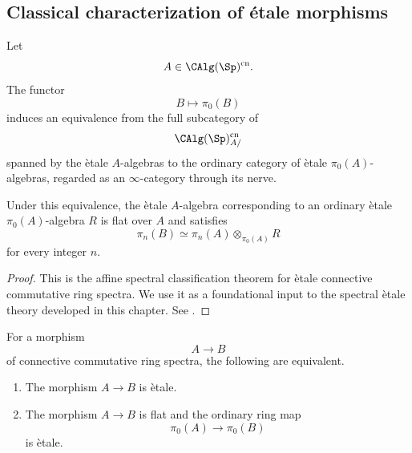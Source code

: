 \subsection{Classical characterization of \texorpdfstring{\'{e}tale}{etale}
morphisms}

\begin{theorem}
\label{thm:affine-spectral-etale-classification}
Let
\[
    A
    \in
    \CAlg(\Sp)^{\mathrm{cn}}.
\]
The functor
\[
    B
    \longmapsto
    \pi_0(B)
\]
induces an equivalence from the full subcategory of
\[
    \CAlg(\Sp)^{\mathrm{cn}}_{A/}
\]
spanned by the \`etale \(A\)-algebras to the ordinary category of
\`etale \(\pi_0(A)\)-algebras, regarded as an \(\infty\)-category through
its nerve.

Under this equivalence, the \`etale \(A\)-algebra corresponding to an
ordinary \`etale \(\pi_0(A)\)-algebra \(R\) is flat over \(A\) and
satisfies
\[
    \pi_n(B)
    \simeq
    \pi_n(A)
    \otimes_{\pi_0(A)}
    R
\]
for every integer \(n\).
\end{theorem}

\begin{proof}
This is the affine spectral classification theorem for \`etale
connective commutative ring spectra. We use it as a foundational input
to the spectral \`etale theory developed in this chapter. See
\cite{LurieSAG,KhanBraveNewMotivicI}.
\end{proof}

\begin{theorem}
\label{thm:spectral-etale-criterion}
For a morphism
\[
    A
    \longrightarrow
    B
\]
of connective commutative ring spectra, the following are equivalent.
\begin{enumerate}[label=(\roman*)]
    \item The morphism \(A\to B\) is \`etale.

    \item The morphism \(A\to B\) is flat and the ordinary ring map
    \[
        \pi_0(A)
        \longrightarrow
        \pi_0(B)
    \]
    is \`etale.
\end{enumerate}
\end{theorem}


